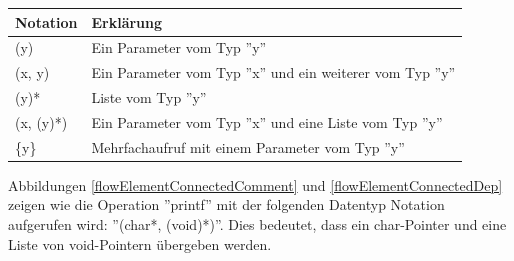\begin{center}
\begin{tabular}{|l|l|}
	\hline
	Notation & Erklärung \\
	\hline
	(y) & Ein Parameter vom Typ ''y'' \\
	\hline
	(x, y) & Ein Parameter vom Typ ''x'' und ein weiterer vom Typ ''y'' \\
	\hline
	(y)* & Liste vom Typ ''y'' \\
	\hline
	(x, (y)*) & Ein Parameter vom Typ ''x'' und eine Liste vom Typ ''y'' \\
	\hline
	\{y\} & Mehrfachaufruf mit einem Parameter vom Typ ''y'' \\
	\hline
\end{tabular}
\end{center}

Abbildungen \ref{flowElementConnectedComment} und \ref{flowElementConnectedDep} zeigen wie die Operation ''printf'' mit
der folgenden Datentyp Notation aufgerufen wird: ''(char*, (void)*)''. Dies bedeutet, dass ein char-Pointer und eine Liste
von void-Pointern übergeben werden.
